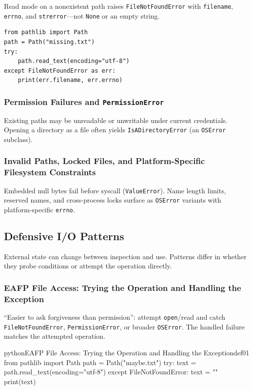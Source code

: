 \documentclass[a4paper,twoside]{report}
\begin{document}
Read mode on a nonexistent path raises \texttt{FileNotFoundError} with \texttt{filename}, \texttt{errno}, and \texttt{strerror}---not \texttt{None} or an empty string.

\begin{verbatim}
from pathlib import Path
path = Path("missing.txt")
try:
    path.read_text(encoding="utf-8")
except FileNotFoundError as err:
    print(err.filename, err.errno)
\end{verbatim}

\subsubsection{Permission Failures and \texttt{PermissionError}}

Existing paths may be unreadable or unwritable under current credentials. Opening a directory as a file often yields \texttt{IsADirectoryError} (an \texttt{OSError} subclass).

\subsubsection{Invalid Paths, Locked Files, and Platform-Specific Filesystem Constraints}

Embedded null bytes fail before syscall (\texttt{ValueError}). Name length limits, reserved names, and cross-process locks surface as \texttt{OSError} variants with platform-specific \texttt{errno}.


\subsection{Defensive I/O Patterns}

External state can change between inspection and use. Patterns differ in whether they probe conditions or attempt the operation directly.

\subsubsection{EAFP File Access: Trying the Operation and Handling the Exception}

``Easier to ask forgiveness than permission'': attempt \texttt{open}/read and catch \texttt{FileNotFoundError}, \texttt{PermissionError}, or broader \texttt{OSError}. The handled failure matches the attempted operation.

\begin{codebox}[]{python}{EAFP File Access: Trying the Operation and Handling the Exception}{def01}
from pathlib import Path
path = Path("maybe.txt")
try:
    text = path.read_text(encoding="utf-8")
except FileNotFoundError:
    text = ""
print(text)
\end{codebox}
\end{document}
